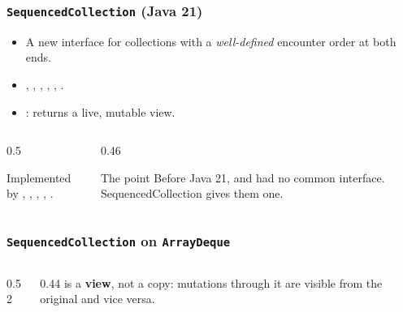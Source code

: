 \documentclass[aspectratio=169,10pt,compress]{beamer}
\begin{document}
\begin{frame}[t,fragile] \frametitle{\texttt{SequencedCollection} (Java 21)}
  \begin{itemize}
    \item A new interface for collections with a \emph{well-defined}
          encounter order at both ends.
    \item {}, , , ,
          , .
    \item {}: returns a live, mutable view.
  \end{itemize}
  \begin{columns}[T]
    \begin{column}{0.5\textwidth}
      \begin{block}{Implemented by}
        \small
        , , ,
        , .
      \end{block}
    \end{column}
    \begin{column}{0.46\textwidth}
      \begin{block}{The point}
        \small
        Before Java 21,  and
         had no common interface.
        SequencedCollection gives them one.
      \end{block}
    \end{column}
  \end{columns}
\end{frame}




\begin{frame}[t,fragile] \frametitle{\texttt{SequencedCollection} on \texttt{ArrayDeque}}
  \begin{columns}[T]
    \begin{column}{0.52\textwidth}
    \end{column}
    \begin{column}{0.44\textwidth}
      \small
       is a \textbf{view}, not a copy: mutations through it
      are visible from the original and vice versa.
    \end{column}
  \end{columns}
\end{frame}
\end{document}
